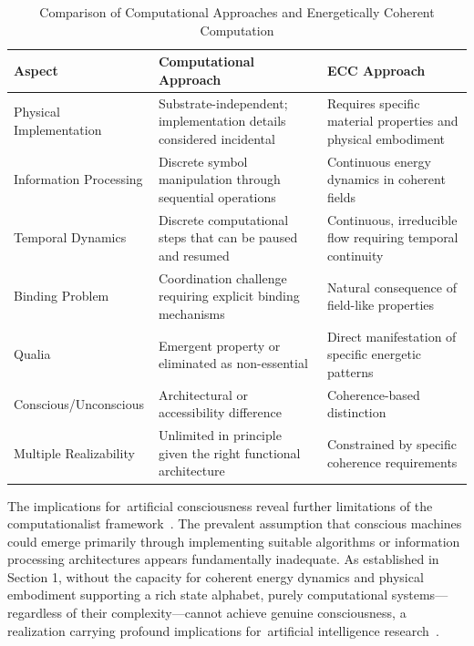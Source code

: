 \begin{table}[h]
    \caption{Comparison of Computational Approaches and Energetically Coherent Computation}
    \centering
    \begin{tabular}{p{3cm}|p{5cm}|p{5cm}}
        \hline
        \textbf{Aspect}         & \textbf{Computational Approach}                                     & \textbf{ECC Approach}                                         \\
        \hline
        Physical Implementation & Substrate-independent; implementation details considered incidental & Requires specific material properties and physical embodiment \\
        \hline
        Information Processing  & Discrete symbol manipulation through sequential operations          & Continuous energy dynamics in coherent fields                 \\
        \hline
        Temporal Dynamics       & Discrete computational steps that can be paused and resumed         & Continuous, irreducible flow requiring temporal continuity    \\
        \hline
        Binding Problem         & Coordination challenge requiring explicit binding mechanisms        & Natural consequence of field-like properties                  \\
        \hline
        Qualia                  & Emergent property or eliminated as non-essential                    & Direct manifestation of specific energetic patterns           \\
        \hline
        Conscious/Unconscious   & Architectural or accessibility difference                           & Coherence-based distinction                                   \\
        \hline
        Multiple Realizability  & Unlimited in principle given the right functional architecture      & Constrained by specific coherence requirements                \\
        \hline
    \end{tabular}
\end{table}

The implications for~artificial consciousness reveal further limitations of the computationalist framework~\cite{hunt2024electromagnetic,McFadden2020}. The prevalent assumption that conscious machines could emerge primarily through implementing suitable algorithms or information processing architectures appears fundamentally inadequate. As established in Section 1, without the capacity for coherent energy dynamics and physical embodiment supporting a rich state alphabet, purely computational systems—regardless of their complexity—cannot achieve genuine consciousness, a realization carrying profound implications for~artificial intelligence research~\cite{seth2024conscious,da2024mathematical}.

